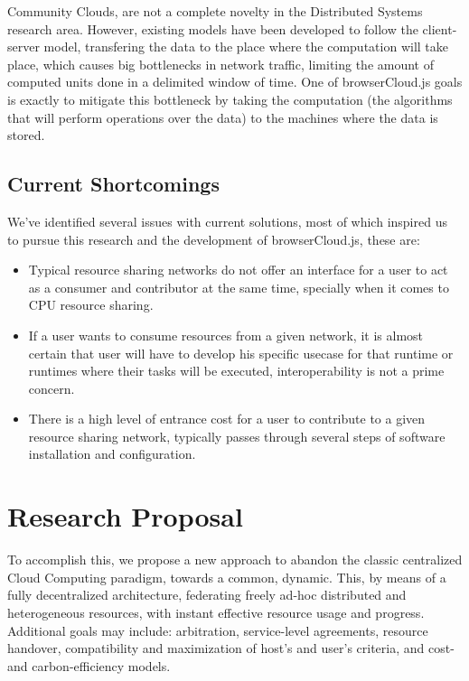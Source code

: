 Community Clouds\cite{Barraca2011}\cite{Navarro}, are not a complete novelty in the Distributed Systems research area. However, existing models have been developed to follow the client-server model, transfering the data to the place where the computation will take place, which causes big bottlenecks in network traffic, limiting the amount of computed units done in a delimited window of time. One of browserCloud.js goals is exactly to mitigate this bottleneck by taking the computation (the algorithms that will perform operations over the data) to the machines where the data is stored.


\subsection{Current Shortcomings}

We've identified several issues with current solutions, most of which inspired us to pursue this research and the development of browserCloud.js, these are:

\begin{itemize}
    \item Typical resource sharing networks do not offer an interface for a user to act as a consumer and contributor at the same time, specially when it comes to CPU resource sharing.
    \item If a user wants to consume resources from a given network, it is almost certain that user will have to develop his specific usecase for that runtime or runtimes where their tasks will be executed, interoperability is not a prime concern.
    \item There is a high level of entrance cost for a user to contribute to a given resource sharing network, typically passes through several steps of software installation and configuration.
\end{itemize}

\section{Research Proposal}

To accomplish this, we propose a new approach to abandon the classic centralized Cloud Computing paradigm, towards a common, dynamic. This, by means of a fully decentralized architecture, federating freely ad-hoc distributed and heterogeneous resources, with instant effective resource usage and progress. Additional goals may include: arbitration, service-level agreements, resource handover, compatibility and maximization of host's and user's criteria, and cost- and carbon-efficiency models.

